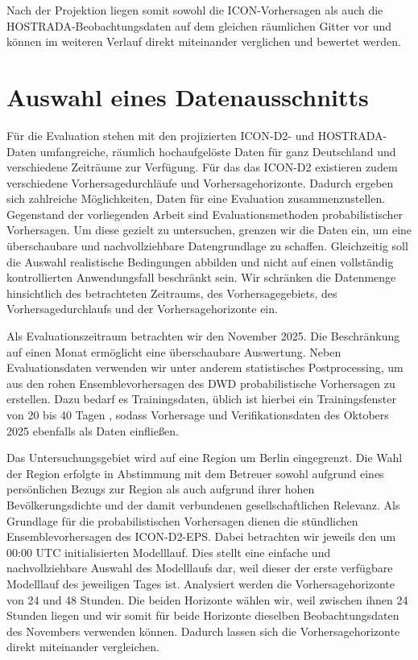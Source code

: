 Nach der Projektion liegen somit sowohl die ICON-Vorhersagen als auch die HOST\-RADA-Beobachtungs\-daten auf dem gleichen räumlichen Gitter vor und können im weiteren Verlauf direkt miteinander verglichen und bewertet werden.


\section{Auswahl eines Datenausschnitts} \label{sec:used_data}
Für die Evaluation stehen mit den projizierten ICON-D2- und HOSTRADA-Daten umfangreiche, räumlich hochaufgelöste Daten für ganz Deutschland und verschiedene Zeiträume zur Verfügung. Für das das ICON-D2 existieren zudem verschiedene Vorhersagedurchläufe und Vorhersagehorizonte. Dadurch ergeben sich zahlreiche Möglichkeiten, Daten für eine Evaluation zusammenzustellen. Gegenstand der vorliegenden Arbeit sind Evaluationsmethoden probabilistischer Vorhersagen. Um diese gezielt zu untersuchen, grenzen wir die Daten ein, um eine überschaubare und nachvollziehbare Datengrundlage zu schaffen. Gleichzeitig soll die Auswahl realistische Bedingungen abbilden und nicht auf einen vollständig kontrollierten Anwendungsfall beschränkt sein. Wir schränken die Datenmenge hinsichtlich des betrachteten Zeitraums, des Vorhersagegebiets, des Vorhersagedurchlaufs und der Vorhersagehorizonte ein.

Als Evaluationszeitraum betrachten wir den November 2025. Die Beschränkung auf einen Monat ermöglicht eine überschaubare Auswertung.  Neben Evaluationsdaten verwenden wir unter anderem statistisches Postprocessing, um aus den rohen Ensemblevorhersagen des DWD probabilistische Vorhersagen zu erstellen. Dazu bedarf es Trainingsdaten, üblich ist hierbei ein Trainingsfenster von 20 bis 40 Tagen \parencite{gneiting2014calibration}, sodass Vorhersage und Verifikationsdaten des Oktobers 2025 ebenfalls als Daten einfließen.

Das Untersuchungsgebiet wird auf eine Region um Berlin eingegrenzt. Die Wahl der Region erfolgte in Abstimmung mit dem Betreuer sowohl aufgrund eines persönlichen Bezugs zur Region als auch aufgrund ihrer hohen Bevölkerungsdichte und der damit verbundenen gesellschaftlichen Relevanz. Als Grundlage für die probabilistischen Vorhersagen dienen die stündlichen Ensemblevorhersagen des ICON-D2-EPS. Dabei betrachten wir jeweils den um 00:00 UTC initialisierten Modelllauf. Dies stellt eine einfache und nachvollziehbare Auswahl des Modelllaufs dar, weil dieser der erste verfügbare Modelllauf des jeweiligen Tages ist. Analysiert werden die Vorhersagehorizonte von 24 und 48 Stunden. Die beiden Horizonte wählen wir, weil zwischen ihnen 24 Stunden liegen und wir somit für beide Horizonte dieselben Beobachtungsdaten des Novembers verwenden können. Dadurch lassen sich die Vorhersagehorizonte direkt miteinander vergleichen.

